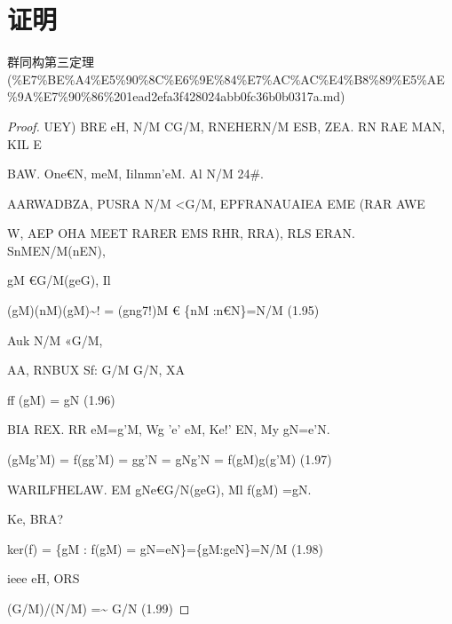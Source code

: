 \section*{证明}

\begin{note}[来源上级主题]

群同构第三定理 (\%E7\%BE\%A4\%E5\%90\%8C\%E6\%9E\%84\%E7\%AC\%AC\%E4\%B8\%89\%E5\%AE\%9A\%E7\%90\%86\%201ead2efa3f428024abb0fc36b0b0317a.md)

\end{note}

\begin{proof}

UEY) BRE eH, N/M CG/M, RNEHERN/M ESB, ZEA. RN RAE MAN, KIL E

BAW. One€N, meM, Iilnmn'eM. Al N/M 24\#.

AARWADBZA, PUSRA N/M <G/M, EPFRANAUAIEA EME (RAR AWE

W, AEP OHA MEET RARER EMS RHR, RRA), RLS ERAN. SnMEN/M(nEN),

gM €G/M(geG), Il

(gM)(nM)(gM)\textasciitilde{}! = (gng7!)M € \{nM :n€N\}=N/M                            (1.95)

Auk N/M «G/M,

AA, RNBUX Sf: G/M G/N, XA

ff (gM) = gN                                                              (1.96)

BIA REX. RR eM=g'M, Wg 'e’ eM, Ke!’ EN, My gN=e'N.

(gMg’M) = f(gg’M) = gg'N = gNg’N = f(gM)g(g'M)                               (1.97)

WARILFHELAW. EM gNe€G/N(geG), Ml f(gM) =gN.

Ke, BRA?

ker(f) = \{gM : f(gM) = gN=eN\}=\{gM:geN\}=N/M                    (1.98)

ieee eH, ORS

(G/M)/(N/M) =\textasciitilde{} G/N                                (1.99)

\end{proof}

